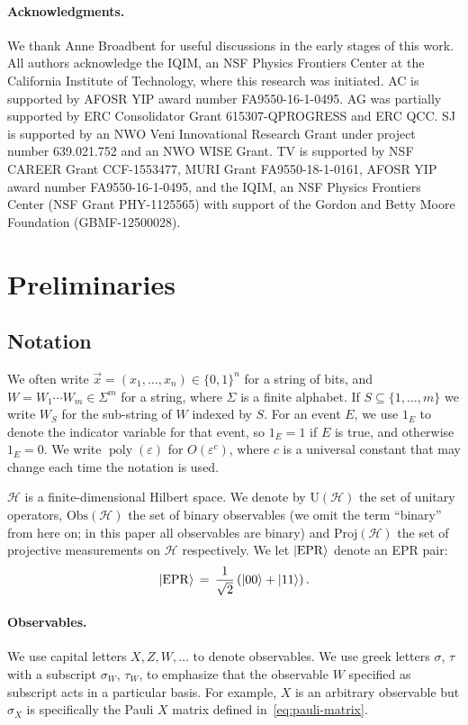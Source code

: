 \documentclass[11pt]{article}
\newcommand{\ket}[1]{|#1\rangle}
\newcommand{\setft}[1]{\mathrm{#1}}
\newcommand{\Proj}{\setft{Proj}}
\newcommand{\Obs}{\setft{Obs}}
\newcommand{\Unitary}{\setft{U}}
\DeclareMathOperator{\poly}{poly}
\newcommand{\mH}{\mathcal{H}}
\newcommand{\eps}{\varepsilon}
\newcommand{\EPR}{{\rm EPR}}
\begin{document}
\paragraph{Acknowledgments.} We thank Anne Broadbent for useful discussions in the early stages of this work. All authors acknowledge the IQIM, an NSF Physics Frontiers Center at the California Institute of Technology, where this research was initiated.
AC is supported by AFOSR YIP award number FA9550-16-1-0495.
AG was partially supported by ERC Consolidator Grant 615307-QPROGRESS and ERC QCC.
SJ is supported by an NWO Veni Innovational Research Grant under project number 639.021.752 and an NWO WISE Grant.
TV is supported by NSF CAREER Grant CCF-1553477, MURI Grant FA9550-18-1-0161, AFOSR YIP award number FA9550-16-1-0495, and the IQIM, an NSF Physics Frontiers Center (NSF Grant PHY-1125565) with support of the Gordon and Betty Moore Foundation (GBMF-12500028).



\section{Preliminaries}\label{sec:prelim}


\subsection{Notation}
\label{sec:prelim-notation}

We often write $\vec{x} =(x_1,\ldots,x_n)\in \{0,1\}^n$ for a string of bits, and $W=W_1\cdots W_m\in\Sigma^m$ for a string, where $\Sigma$ is a finite alphabet. If $S\subseteq \{1,\ldots,m\}$ we write $W_S$ for the sub-string of $W$ indexed by $S$. For an event $E$, we use $1_{E}$ to denote the indicator variable for that event, so $1_E=1$ if $E$ is true, and otherwise $1_E=0$. We write $\poly(\eps)$ for $O(\eps^c)$, where $c$ is a universal constant that may change each time the notation is used. 

$\mH$ is a finite-dimensional Hilbert space.  We denote by $\Unitary(\mH)$ the set of unitary operators, $\Obs(\mH)$ the set of binary observables (we omit the term ``binary'' from here on; in this paper all observables are binary) and $\Proj(\mH)$ the set of projective measurements on $\mH$ respectively.  
We let $\ket{\EPR}$ denote an EPR pair: 
$$\ket{\EPR}\,=\,\frac{1}{\sqrt{2}}\left(\ket{00}+\ket{11}\right).$$


\paragraph{Observables.}
We use capital letters $X,Z,W,\ldots$ to denote observables. We use greek letters $\sigma$, $\tau$ with a subscript $\sigma_W$, $\tau_W$, to emphasize that the observable $W$ specified as subscript acts in a particular basis. For example, $X$ is an arbitrary observable but $\sigma_X$ is specifically the Pauli $X$ matrix defined in~\eqref{eq:pauli-matrix}.
\end{document}
